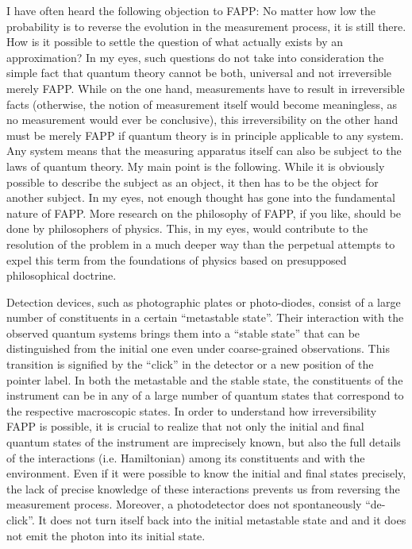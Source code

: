 \documentclass[12pt]{article}
\begin{document}
I have often heard the following objection to FAPP: No matter how low the probability is to reverse the evolution in the measurement process, it is still there. How is it possible to settle the question of what actually exists by an approximation? In my eyes, such questions do not take into consideration the simple fact that quantum theory cannot be both, universal and not irreversible merely FAPP. While on the one hand, measurements have to result in irreversible facts (otherwise, the notion of measurement itself would become meaningless, as no measurement would ever be conclusive), this irreversibility on the other hand must be merely FAPP if quantum theory is in principle applicable to any system. Any system means that the measuring apparatus itself can also be subject to the laws of quantum theory. My main point is the following. While it is obviously possible to describe the subject as an object, it then has to be the object for another subject. In my eyes, not enough thought has gone into the fundamental nature of FAPP. More research on the philosophy of FAPP, if you like, should be done by philosophers of physics. This, in my eyes, would contribute to the resolution of the problem in a much deeper way than the perpetual attempts to expel this term from the foundations of physics based on presupposed philosophical doctrine. 

Detection devices, such as photographic plates or photo-diodes, consist of a large number of constituents in a certain ``metastable state''. Their interaction with the observed quantum systems brings them into a ``stable state'' that can be distinguished from the initial one even under coarse-grained observations. This transition is signified by the ``click'' in the detector or a new position of the pointer label. In both the metastable and the stable state, the constituents of the instrument can be in any of a large number of quantum states that correspond to the respective macroscopic states. In order to understand how irreversibility FAPP is possible, it is crucial to realize that not only the initial and final quantum states of the instrument are imprecisely known, but also the full details of the interactions (i.e. Hamiltonian) among its constituents and with the environment. Even if it were possible to know the initial and final states precisely, the lack of precise knowledge of these interactions prevents us from reversing the measurement process. Moreover, a photodetector does not spontaneously ``de-click''. It does not turn itself back into the initial metastable state and and it does not emit the photon into its initial state. 
\end{document}
